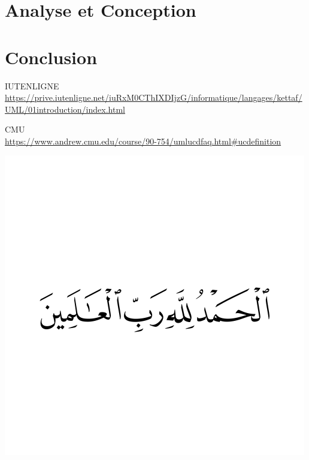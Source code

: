 \documentclass[12pt, a4paper]{report}
\begin{document}
	\chapter{Analyse et Conception}
	
	
	
	\pagebreak

	\chapter{Conclusion}
	
	\pagebreak

	\begin{thebibliography}{999}
        
        IUTENLIGNE \\
        \url{https://prive.iutenligne.net/iuRxM0CThIXDIjzG/informatique/langages/kettaf/UML/01introduction/index.html}

        CMU \\
        \url{https://www.andrew.cmu.edu/course/90-754/umlucdfaq.html#ucdefinition}
    
    \end{thebibliography}

	\newpage
	\begin{center}
		\vspace*{\fill}
		\vspace*{\fill}
		\includegraphics[width=500px]{images/hamdulillah.png}
		\vspace*{\fill}
		\vspace*{\fill}
	\end{center}
	
\end{document}
